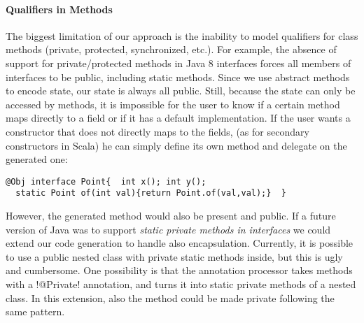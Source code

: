 \begin{comment}
@Obj interface Person$ extends Person{//will be further expanded by @Obj
  void name(String val);
  default void rename(String newName){ if(/*valid name*/){ this.name(val);}}
  String name();
  static Person from(String val){ if(/*valid name*/){return Person$.of(val);}
    throw /*invalid name*/}  }
\end{lstlisting}

This is not a perfect solution, since
\Q@Person$@ can still be seen inside the \Q@Person@ package and heirs of
\Q@Person$@,
however it is surprising we achieve such of a good result without any language
support for privacy in interfaces.
\end{comment}

\paragraph{Qualifiers in Methods} %
The biggest limitation of our approach is the inability to model qualifiers
for class methods (private, protected, synchronized, etc.). For example, the absence
of support for private/protected methods in Java 8 interfaces forces all
members of interfaces to be public, including static methods. Since we use
abstract methods to encode state, our state is always all public. Still, because 
the state can only be accessed by methods, it 
is impossible for the user to know if a certain method maps directly to a field
or if it has a default implementation.  If the user wants a constructor that
does not directly maps to the fields, (as for secondary constructors in Scala)
he can simply define its own \Q@of@ method and delegate on the generated one:
\begin{lstlisting}
@Obj interface Point{  int x(); int y();
  static Point of(int val){return Point.of(val,val);}  }
\end{lstlisting}
However, the generated \Q@of@ method would also be present and public.  If a
future version of Java was to support \emph{static private methods in
  interfaces} we could extend our code generation to handle also encapsulation.
Currently, it is possible to use a public nested class with private static
methods inside, but this is ugly and cumbersome. One possibility is that the
annotation processor takes methods with a \Q!@Private! annotation, and turns it into
static private methods of a nested class. In this extension, also the \Q@of@
method could be made private following the same pattern.

